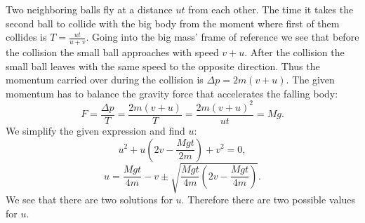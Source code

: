 \solueng
Two neighboring balls fly at a distance $u t$ from each other. The time it takes the second ball to collide with the big body from the moment where first of them collides is $T=\frac{u t}{u+v}$. Going into the big mass’ frame of reference we see that before the collision the small ball approaches with speed $v + u$. After the collision the small ball leaves with the same speed to the opposite direction. Thus the momentum carried over during the collision is $\Delta p = 2m(v + u)$. The given momentum has to balance the gravity force that accelerates the falling body:
\[ F=\frac{\Delta p}{T}=\frac{2m(v + u)}{T} = \frac{2m(v + u)^2}{ut}=Mg. \] 
We simplify the given expression and find $u$:
\[
u^2 + u\left( 2v - \frac{Mgt}{2m}\right) + v^2 = 0,
\] 
\[
u = \frac{Mgt}{4m} - v \pm \sqrt{\frac{Mgt}{4m}\left( 2v - \frac{Mgt}{4m}\right)}.
\]
We see that there are two solutions for $u$. Therefore there are two possible values for $u$.
\probend